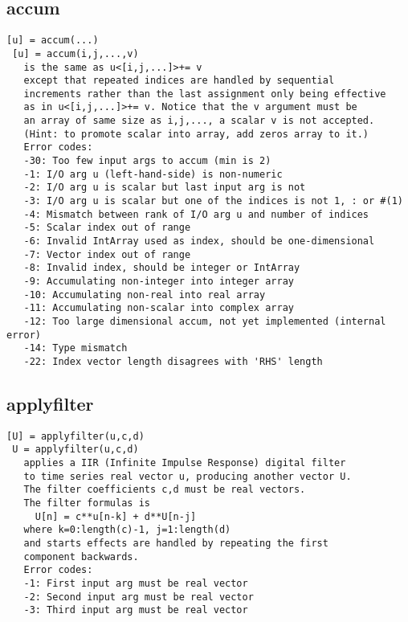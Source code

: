 \documentclass[a4paper]{article}
\begin{document}
\subsection{accum\label{accum}}

\begin{tscreen}
\begin{verbatim}
[u] = accum(...)
 [u] = accum(i,j,...,v)
   is the same as u<[i,j,...]>+= v
   except that repeated indices are handled by sequential
   increments rather than the last assignment only being effective
   as in u<[i,j,...]>+= v. Notice that the v argument must be
   an array of same size as i,j,..., a scalar v is not accepted.
   (Hint: to promote scalar into array, add zeros array to it.)
   Error codes:
   -30: Too few input args to accum (min is 2)
   -1: I/O arg u (left-hand-side) is non-numeric
   -2: I/O arg u is scalar but last input arg is not
   -3: I/O arg u is scalar but one of the indices is not 1, : or #(1)
   -4: Mismatch between rank of I/O arg u and number of indices
   -5: Scalar index out of range
   -6: Invalid IntArray used as index, should be one-dimensional
   -7: Vector index out of range
   -8: Invalid index, should be integer or IntArray
   -9: Accumulating non-integer into integer array
   -10: Accumulating non-real into real array
   -11: Accumulating non-scalar into complex array
   -12: Too large dimensional accum, not yet implemented (internal error)
   -14: Type mismatch
   -22: Index vector length disagrees with 'RHS' length
\end{verbatim}
\end{tscreen}



\subsection{applyfilter\label{applyfilter}}

\begin{tscreen}
\begin{verbatim}
[U] = applyfilter(u,c,d)
 U = applyfilter(u,c,d)
   applies a IIR (Infinite Impulse Response) digital filter
   to time series real vector u, producing another vector U.
   The filter coefficients c,d must be real vectors.
   The filter formulas is
     U[n] = c**u[n-k] + d**U[n-j]
   where k=0:length(c)-1, j=1:length(d)
   and starts effects are handled by repeating the first
   component backwards.
   Error codes:
   -1: First input arg must be real vector
   -2: Second input arg must be real vector
   -3: Third input arg must be real vector
\end{verbatim}
\end{tscreen}
\end{document}
